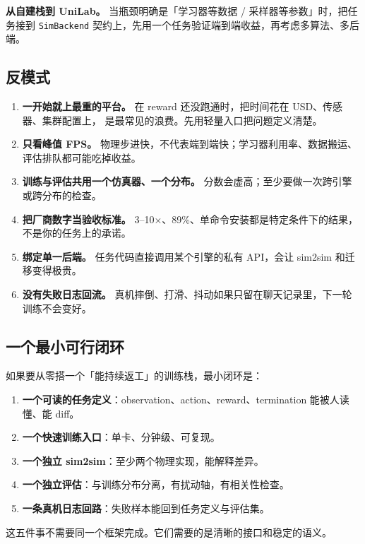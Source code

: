 \documentclass[UTF8, 11pt, a4paper, fontset=windows]{ctexart}
\newcommand{\term}[1]{\texttt{#1}}
\begin{document}
\textbf{从自建栈到 UniLab。} 当瓶颈明确是「学习器等数据 / 采样器等参数」时，把任务接到 \term{SimBackend}
契约上，先用一个任务验证端到端收益，再考虑多算法、多后端。

\subsection{反模式}

\begin{enumerate}
  \item \textbf{一开始就上最重的平台。} 在 reward 还没跑通时，把时间花在 USD、传感器、集群配置上，
        是最常见的浪费。先用轻量入口把问题定义清楚。
  \item \textbf{只看峰值 FPS。} 物理步进快，不代表端到端快；学习器利用率、数据搬运、评估排队都可能吃掉收益。
  \item \textbf{训练与评估共用一个仿真器、一个分布。} 分数会虚高；至少要做一次跨引擎或跨分布的检查。
  \item \textbf{把厂商数字当验收标准。} 3--10×、89\%、单命令安装都是特定条件下的结果，不是你的任务上的承诺。
  \item \textbf{绑定单一后端。} 任务代码直接调用某个引擎的私有 API，会让 sim2sim 和迁移变得极贵。
  \item \textbf{没有失败日志回流。} 真机摔倒、打滑、抖动如果只留在聊天记录里，下一轮训练不会变好。
\end{enumerate}

\subsection{一个最小可行闭环}

如果要从零搭一个「能持续返工」的训练栈，最小闭环是：

\begin{enumerate}
  \item \textbf{一个可读的任务定义}：observation、action、reward、termination 能被人读懂、能 diff。
  \item \textbf{一个快速训练入口}：单卡、分钟级、可复现。
  \item \textbf{一个独立 sim2sim}：至少两个物理实现，能解释差异。
  \item \textbf{一个独立评估}：与训练分布分离，有扰动轴，有相关性检查。
  \item \textbf{一条真机日志回路}：失败样本能回到任务定义与评估集。
\end{enumerate}

这五件事不需要同一个框架完成。它们需要的是清晰的接口和稳定的语义。
\end{document}

